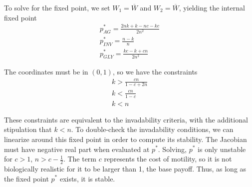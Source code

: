 \documentclass[12pt]{report}
\begin{document}
To solve for the fixed point, we set $W_1 = \overline{W}$ and $W_2 = \overline{W}$, yielding the internal fixed point 
\begin{gather*}
p_{AG}^* = \displaystyle{\frac{2 n k + k - n c - k c}{2n^2}} \\
p_{INV}^* = \displaystyle{\frac{n-k}{n}} \\
p_{GLY}^* = \displaystyle{\frac{k c - k + c n}{2n^2}}
\end{gather*}

		
The coordinates must be in $(0,1)$, so we have the constraints
\begin{gather}
k > \frac{cn}{1 - c + 2n}\\
k < \frac{cn}{1-c} \\
k < n
\end{gather}

These constraints are equivalent to the invadability criteria, with the additional stipulation that $k < n$. 
To double-check the invadability conditions, we can linearize around this fixed point in order to compute its stability. The Jacobian must have negative real part when evaluated at $p^*$. Solving, $p^*$ is only unstable for $c > 1$, $n > c - \frac{1}{2}$. The term $c$ represents the cost of motility, so it is not biologically realistic for it to be larger than 1, the base payoff. Thus, as long as the fixed point $p^*$ exists, it is stable. \\
\end{document}
